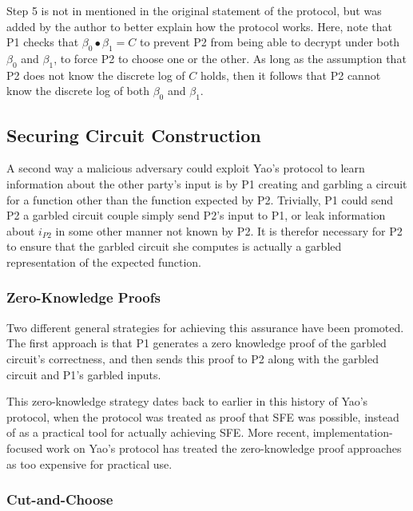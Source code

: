 Step 5 is not in mentioned in the original\cite{bellare1990non} statement of the protocol, but was added by the author to better explain how the protocol works. Here, note that \ac{P1} checks that $\beta_0 \bullet \beta_1 = C$ to prevent \ac{P2} from being able to decrypt under both $\beta_0$ and $\beta_1$, to force \ac{P2} to choose one or the other. As long as the assumption that \ac{P2} does not know the discrete log of $C$ holds, then it follows that \ac{P2} cannot know the discrete log of both $\beta_0$ and $\beta_1$.

\subsection{Securing Circuit Construction}

A second way a malicious adversary could exploit Yao's protocol to learn information about the other party's input is by \ac{P1} creating and garbling a circuit for a function other than the function expected by \ac{P2}. Trivially, \ac{P1} could send \ac{P2} a garbled circuit couple simply send \ac{P2}'s input to \ac{P1}, or leak information about $i_{P2}$ in some other manner not known by \ac{P2}.  It is therefor necessary for \ac{P2} to ensure that the garbled circuit she computes is actually a garbled representation of the expected function.

\subsubsection{Zero-Knowledge Proofs}

Two different general strategies for achieving this assurance have been promoted.  The first approach is that \ac{P1} generates a zero knowledge proof of the garbled circuit's correctness, and then sends this proof to \ac{P2} along with the garbled circuit and \ac{P1}'s garbled inputs\cite{goldreich1987play, goldreich2009foundations}.

This zero-knowledge strategy dates back to earlier in this history of Yao's protocol, when the protocol was treated as proof that \ac{SFE} was possible, instead of as a practical tool for actually achieving \ac{SFE}. More recent, implementation-focused work on Yao's protocol has treated the zero-knowledge proof approaches as too expensive for practical use\cite{lindell2007efficient, mohassel2006efficiency, malkhi2004fairplay}.

\subsubsection{Cut-and-Choose}

